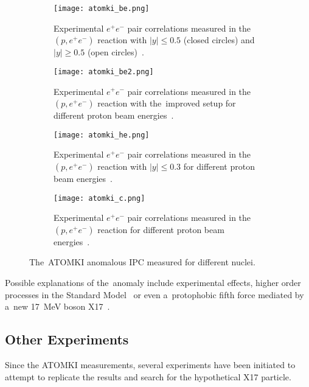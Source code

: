 				\begin{figure}
					\centering
					\begin{subfigure}[t]{0.48\textwidth}
						\centering
						\texttt{[image: atomki\_be.png]}
						\caption{Experimental $e^+e^-$ pair correlations measured in the~$(p,e^+e^-)$ reaction with $|y| \leq 0.5$ (closed circles) and $|y| \geq 0.5$ (open circles)~\cite{atomki_be}.}
						\label{fig:atomki_be}
					\end{subfigure}
					\hfill
					\begin{subfigure}[t]{0.42\textwidth}
						\centering
						\texttt{[image: atomki\_be2.png]}
						\caption{Experimental $e^+e^-$ pair correlations measured in the~$(p,e^+e^-)$ reaction with the~improved setup for different proton beam energies~\cite{atomki_be2}.}
						\label{fig:atomki_be2}
					\end{subfigure}
					\begin{subfigure}[t]{0.45\textwidth}
						\centering
						\texttt{[image: atomki\_he.png]}
						\caption{Experimental $e^+e^-$ pair correlations measured in the~$(p,e^+e^-)$ reaction with $|y| \leq 0.3$ for different proton beam energies~\cite{atomki_he2}.}
						\label{fig:atomki_he}
					\end{subfigure}
					\hfill
					\begin{subfigure}[t]{0.45\textwidth}
						\centering
						\texttt{[image: atomki\_c.png]}
						\caption{Experimental $e^+e^-$ pair correlations measured in the~$(p,e^+e^-)$ reaction for different proton beam energies~\cite{atomki_c}.}
						\label{fig:atomki_c}
					\end{subfigure}
					\caption{The~ATOMKI anomalous \ac{IPC} measured for different nuclei.}
					\label{fig:atomki}
				\end{figure}
			
			Possible explanations of the~anomaly include experimental effects, higher order processes in the Standard Model~\cite{kalman,aleksejevs} or even a~protophobic fifth force mediated by a~new 17~MeV boson X17~\cite{feng}.
		
		\subsection{Other Experiments}
			Since the ATOMKI measurements, several experiments have been initiated to attempt to replicate the results and search for the hypothetical X17 particle.
			
